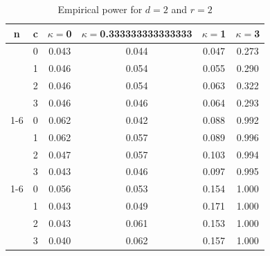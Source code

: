 \documentclass[oneside,11pt]{article}
\begin{document}
\begin{table}[H]
\centering
\caption{Empirical power for $d = 2$ and $r = 2$}
\centering
\begin{tabular}[t]{cccccc}
\toprule
n & c & $\kappa = $0 & $\kappa = $0.333333333333333 & $\kappa = $1 & $\kappa = $3\\
\midrule
 & 0 & 0.043 & 0.044 & 0.047 & 0.273\\

 & 1 & 0.046 & 0.054 & 0.055 & 0.290\\

 & 2 & 0.046 & 0.054 & 0.063 & 0.322\\

\multirow{-4}{*}{\centering\arraybackslash 10} & 3 & 0.046 & 0.046 & 0.064 & 0.293\\
\cmidrule{1-6}
 & 0 & 0.062 & 0.042 & 0.088 & 0.992\\

 & 1 & 0.062 & 0.057 & 0.089 & 0.996\\

 & 2 & 0.047 & 0.057 & 0.103 & 0.994\\

\multirow{-4}{*}{\centering\arraybackslash 50} & 3 & 0.043 & 0.046 & 0.097 & 0.995\\
\cmidrule{1-6}
 & 0 & 0.056 & 0.053 & 0.154 & 1.000\\

 & 1 & 0.043 & 0.049 & 0.171 & 1.000\\

 & 2 & 0.043 & 0.061 & 0.153 & 1.000\\

\multirow{-4}{*}{\centering\arraybackslash 100} & 3 & 0.040 & 0.062 & 0.157 & 1.000\\
\bottomrule
\end{tabular}
\end{table}
\end{document}
